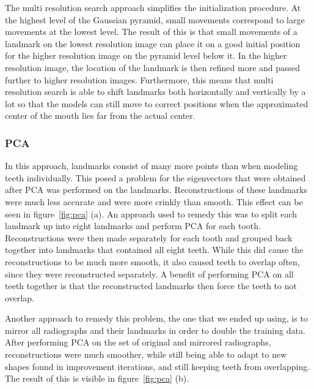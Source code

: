 \documentclass[a4paper]{article}
\begin{document}
The multi resolution search approach simplifies the initialization procedure. 
At the highest level of the Gaussian pyramid, small movements correspond to large movements at the lowest level. 
The result of this is that small movements of a landmark on the lowest resolution image can place it on a good initial position for the higher resolution image on the pyramid level below it. In the higher resolution image, the location of the landmark is then refined more and passed further to higher resolution images.
Furthermore, this means that multi resolution search is able to shift landmarks both horizontally and vertically by a lot so that the models can still move to correct positions when the approximated center of the mouth lies far from the actual center.

\subsubsection{PCA}
In this approach, landmarks consist of many more points than when modeling teeth individually. 
This posed a problem for the eigenvectors that were obtained after PCA was performed on the landmarks. 
Reconstructions of these landmarks were much less accurate and were more crinkly than smooth. 
This effect can be seen in figure~\ref{fig:pca} (a).
An approach used to remedy this was to split each landmark up into eight landmarks and perform PCA for each tooth. 
Reconstructions were then made separately for each tooth and grouped back together into landmarks that contained all eight teeth. 
While this did cause the reconstructions to be much more smooth, it also caused teeth to overlap often, since they were reconstructed separately. 
A benefit of performing PCA on all teeth together is that the reconstructed landmarks then force the teeth to not overlap. 

Another approach to remedy this problem, the one that we ended up using, is to mirror all radiographs and their landmarks in order to double the training data. 
After performing PCA on the set of original and mirrored radiographs, reconstructions were much smoother, while still being able to adapt to new shapes found in improvement iterations, and still keeping teeth from overlapping. The result of this is visible in figure~\ref{fig:pca} (b).
\end{document}
